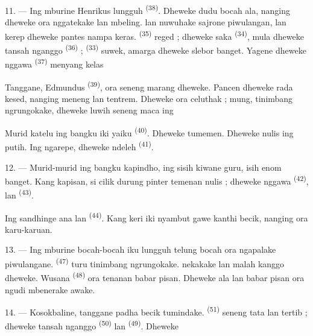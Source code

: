 \VUsaut{4.2mm}
\VUsaut{3.2mm}

11. --- Ing mburine Henrikus lungguh 
\textsuperscript{(38)}. Dheweke dudu bocah ala, nanging dheweke
 ora nggatekake lan mbeling.
 lan  nuwuhake
 sajrone piwulangan, lan kerep dheweke pantes nampa
 keras. 
\textsuperscript{(35)} reged ; dheweke  saka
 \textsuperscript{(34)}, mula dheweke tansah nganggo
 \textsuperscript{(36)} ; 
\textsuperscript{(33)} suwek, amarga dheweke slebor banget. Yagene
dheweke nggawa  \textsuperscript{(37)} menyang
kelas 

Tanggane, Edmundus \textsuperscript{(39)}, ora seneng marang dheweke.
Pancen dheweke rada kesed, nanging meneng lan tentrem. Dheweke ora
celuthak ; mung, tinimbang ngrungokake, dheweke luwih seneng maca
 ing 

Murid katelu ing bangku iki yaiku 
\textsuperscript{(40)}. Dheweke tumemen. Dheweke nulis ing
 putih. Ing ngarepe, dheweke ndeleh
 \textsuperscript{(41)}.

12. --- Murid-murid ing bangku kapindho, ing sisih kiwane guru, isih
enom banget. Kang kapisan, si cilik  durung pinter
temenan nulis ; dheweke nggawa  \textsuperscript{(42)},
 lan  \textsuperscript{(43)}.

Ing sandhinge ana  lan 
\textsuperscript{(44)}. Kang keri iki nyambut gawe kanthi becik,
nanging  ora karu-karuan.

13. --- Ing mburine bocah-bocah iku lungguh telung bocah
 ora ngapalake piwulangane. 
\textsuperscript{(47)} turu tinimbang ngrungokake. 
nekakake  lan malah  kanggo
dheweke. Wusana  \textsuperscript{(48)} ora tenanan
babar pisan. Dheweke  ala lan babar pisan ora ngudi
mbenerake awake.

14. --- Kosokbaline, tanggane padha becik tumindake.
 \textsuperscript{(51)} seneng tata lan tertib ;
dheweke tansah nganggo  \textsuperscript{(50)} lan
 \textsuperscript{(49)}. Dheweke 


